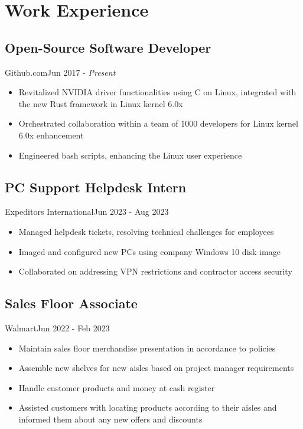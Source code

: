 \section{Work Experience}
\subsection{Open-Source Software Developer}{Github.com}{Jun 2017 - \textit{Present}}
\begin{itemize}
    \item Revitalized NVIDIA driver functionalities using C on Linux, integrated with the new Rust framework in Linux kernel 6.0x
    \item Orchestrated collaboration within a team of 1000 developers for Linux kernel 6.0x enhancement
    \item Engineered bash scripts, enhancing the Linux user experience
\end{itemize}
\subsection{PC Support Helpdesk Intern}{Expeditors International}{Jun 2023 - Aug 2023}
\begin{itemize}
    \item Managed helpdesk tickets, resolving technical challenges for employees
    \item Imaged and configured new PCs using company Windows 10 disk image
    \item Collaborated on addressing VPN restrictions and contractor access security
\end{itemize}
\subsection{Sales Floor Associate}{Walmart}{Jun 2022 - Feb 2023}
\begin{itemize}
    \item Maintain sales floor merchandise presentation in accordance to policies
    \item Assemble new shelves for new aisles based on project manager requirements
    \item Handle customer products and money at cash register
    \item Assisted customers with locating products according to their aisles and informed them about any new offers and discounts 
\end{itemize}
